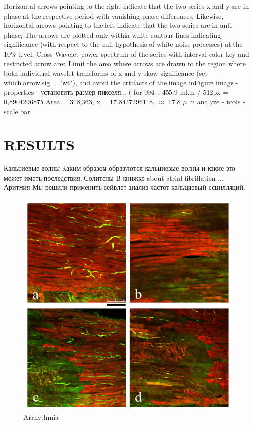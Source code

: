\documentclass[a4paper,12pt]{article}
\begin{document}
Horizontal arrows pointing to the right indicate that the two series x and y are in phase at the respective period with vanishing phase differences.
Likewise, horizontal arrows pointing to the left indicate that the two series are in anti-phase;
The arrows are plotted only within white contour lines indicating significance (with respect to the null hypothesis of white noise processes) at the 10\% level.
Cross-Wavelet power spectrum of the series with interval color key and restricted arrow area
Limit the area where arrows are drawn to the region where both individual wavelet transforms of x and y show significance (set which.arrow.sig = "wt"), and avoid the artifacts of the image inFigure
image - properties - установить размер пикселя...
( for 094--: 455.9 mkm / 512px = 0,8904296875
Area = 318,363, x = 17.8427296118, $\approx$ 17.8 $\mu$ m
analyze - tools - scale bar

\section{RESULTS}
Кальциевые волны
Каким образом образуются кальциевые волны и какие это может иметь последствия.
Солитоны
В книжке \cite{kockskamper2002subcellular} about atrial fibrillation ...
Аритмия
Мы решили применить вейвлет анализ частот кальциевый осцилляций.

\begin{figure}
    \includegraphics[width=\linewidth]{fig1.jpg}
    \caption{Arrhythmia}
    \label{fig:fig1}
\end{figure}
\end{document}

